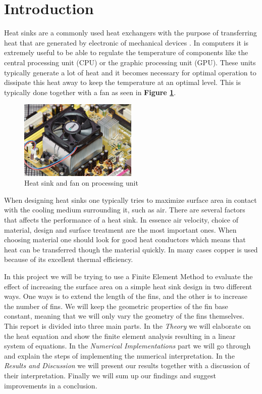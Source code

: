 \section{Introduction}
Heat sinks are a commonly used heat exchangers with the purpose of transferring heat that are generated by electronic of mechanical devices \cite{wiki_hs}. In computers it is extremely useful to be able to regulate the temperature of components like the central processing unit (CPU) or the graphic processing unit	(GPU). These units typically generate a lot of heat and it becomes necessary for optimal operation to dissipate this heat away to keep the temperature at an optimal level. This is typically done together with a fan as seen in \textbf{Figure \ref{fig:heatsink_and_fan}}.

\begin{figure}[h]
    \centering
    \includegraphics[width=0.5\textwidth]{../figures/heatsink_and_fan.jpg}
    \caption{Heat sink and fan on processing unit}
    \label{fig:heatsink_and_fan}
\end{figure}

When designing heat sinks one typically tries to maximize surface area in contact with the cooling medium surrounding it, such as air. There are several factors that affects the performance of a heat sink. In essence air velocity, choice of material, design and surface treatment are the most important ones. When choosing material one should look for good heat conductors which means that heat can be transferred though the material quickly. In many cases copper is used because of its excellent thermal efficiency.

In this project we will be trying to use a Finite Element Method to evaluate the effect of increasing the surface area on a simple heat sink design in two different ways. One ways is to extend the length of the fins, and the other is to increase the number of fins. We will keep the geometric properties of the fin base constant, meaning that we will only vary the geometry of the fins themselves. This report is divided into three main parts. In the \textit{Theory} we will elaborate on the heat equation and show the finite element analysis resulting in a linear system of equations. In the \textit{Numerical Implementations} part we will go through and explain the steps of implementing the numerical interpretation. In the \textit{Results and Discussion} we will present our results together with a discussion of their interpretation. Finally we will sum up our findings and suggest improvements in a conclusion.
